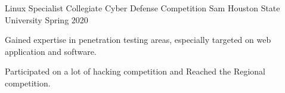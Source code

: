 

\begin{cventries}

  \cventry
    {Linux Specialist} %
    {Collegiate Cyber Defense Competition} %
    {Sam Houston State University} %
    {Spring 2020} %
    {
      \begin{cvitems} %
        \item {Gained expertise in penetration testing areas, especially targeted on web application and software.}
        \item {Participated on a lot of hacking competition and Reached the Regional competition.}
      \end{cvitems}
    }


\end{cventries}
